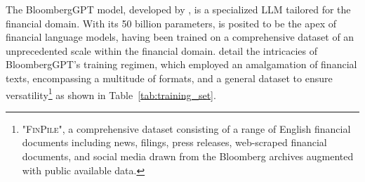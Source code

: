 The BloombergGPT model, developed by \textcite{wu2023bloomberggpt}, is a specialized LLM tailored for the financial domain.
With its 50 billion parameters, is posited to be the apex of financial language models, having been trained on a comprehensive dataset of an unprecedented scale within the financial domain.
\textcite{wu2023bloomberggpt} detail the intricacies of BloombergGPT's training regimen, which employed an amalgamation of financial texts, encompassing a multitude of formats, and a general dataset to ensure versatility\footnote{"\textsc{FinPile}", a comprehensive dataset consisting of a range of English financial documents including news, filings, press releases, web-scraped financial documents, and social media drawn from the Bloomberg archives augmented with public available data.} as shown in Table~\ref{tab:training_set}.

